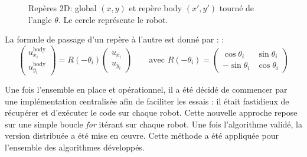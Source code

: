 \begin{figure}[H]
    \centering
    \caption{Repères 2D: global $(x,y)$ et repère body $(x',y')$ tourné de l'angle $\theta$. Le cercle représente le robot.}
    \label{fig:repere_45}
\end{figure}
La formule de passage d'un repère à l'autre est donné par : :
    \begin{equation}
        \begin{pmatrix}
        u_{x_i}^{\text{body}} \\
        u_{y_i}^{\text{body}}
        \end{pmatrix}
        =
        R(-\theta_i)
        \begin{pmatrix}
        u_{x_i} \\
        u_{y_i}
        \end{pmatrix}
        \qquad
        \text{avec } R(-\theta_i) =
        \begin{pmatrix}
        \cos\theta_i & \sin\theta_i \\
        -\sin\theta_i & \cos\theta_i
        \end{pmatrix}
    \end{equation}

Une fois l’ensemble en place et opérationnel, il a été décidé de commencer par une implémentation centralisée afin de faciliter les essais : il était fastidieux de récupérer et d’exécuter le code sur chaque robot. Cette nouvelle approche repose sur une simple boucle \textit{for} itérant sur chaque robot. Une fois l’algorithme validé, la version distribuée a été mise en œuvre. Cette méthode a été appliquée pour l'ensemble des algorithmes développés.

